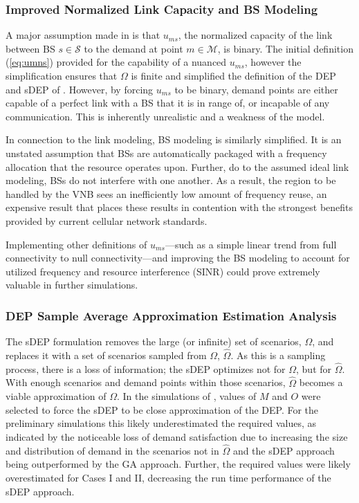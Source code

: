 \documentclass[12pt,dvipsnames]{report}
\begin{document}
\subsubsection{Improved Normalized Link Capacity and BS Modeling}

A major assumption made in  is that $u_{ms}$, the normalized capacity of the link between BS $s \in \mathcal{S}$ to the demand at point $m \in \mathcal{M}$, is binary.  The initial definition (\cref{eq:umns}) provided for the capability of a nuanced $u_{ms}$, however the simplification ensures that $\Omega$ is finite and simplified the definition of the DEP and sDEP of .  However, by forcing $u_{ms}$ to be binary, demand points are either capable of a perfect link with a BS that it is in range of, or incapable of any communication.  This is inherently unrealistic and a weakness of the model.

In connection to the link modeling, BS modeling is similarly simplified.  It is an unstated assumption that BSs are automatically packaged with a frequency allocation that the resource operates upon.  Further, do to the assumed ideal link modeling, BSs do not interfere with one another.  As a result, the region to be handled by the VNB sees an inefficiently low amount of frequency reuse, an expensive result that places these results in contention with the strongest benefits provided by current cellular network standards.

Implementing other definitions of $u_{ms}$---such as a simple linear trend from full connectivity to null connectivity---and improving the BS modeling to account for utilized frequency and resource interference (SINR) could prove extremely valuable in further simulations.

\subsubsection{DEP Sample Average Approximation Estimation Analysis}

The sDEP formulation removes the large (or infinite) set of scenarios, $\Omega$, and replaces it with a set of scenarios sampled from $\Omega$, $\hat{\Omega}$.  As this is a sampling process, there is a loss of information; the sDEP optimizes not for $\Omega$, but for $\hat{\Omega}$.  With enough scenarios and demand points within those scenarios, $\hat{\Omega}$ becomes a viable approximation of $\Omega$.  In the simulations of , values of $M$ and $O$ were selected to force the sDEP to be close approximation of the DEP.  For the preliminary simulations this likely underestimated the required values, as indicated by the noticeable loss of demand satisfaction due to increasing the size and distribution of demand in the scenarios not in $\hat{\Omega}$ and the sDEP approach being outperformed by the GA approach.  Further, the required values were likely overestimated for Cases I and II, decreasing the run time performance of the sDEP approach.
\end{document}
